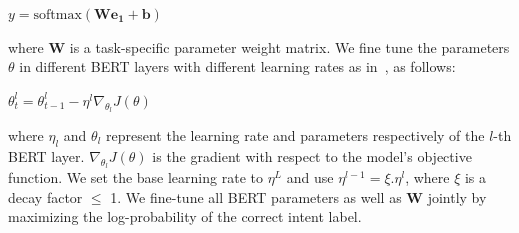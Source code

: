 \begin{center}
$y = \textrm{softmax}(\bm{W e_1} + \bm{b})$
\end{center}

\noindent where $\bm{W}$ is a task-specific parameter weight matrix. 
We fine tune the parameters $\theta$ in different BERT layers with different learning rates as in~\cite{howard2018universal}, %
as follows:

\begin{center}
$\theta_t^l = \theta_{t-1}^l - \eta^l \nabla_{\theta_l} J(\theta)$
\end{center}

\noindent where $\eta_l$ and $\theta_l$ represent the learning rate and parameters respectively of the $l$-th BERT layer. $\nabla_{\theta_l} J(\theta)$ is the gradient with respect to the model's objective function. We set the base learning rate to $\eta^L$ and use $\eta^{l-1} = \xi.\eta^l$, where $\xi$ is a decay factor $\leq$ 1. %
We fine-tune all BERT parameters as well as $\bm{W}$ jointly by maximizing the log-probability of the correct intent label.


